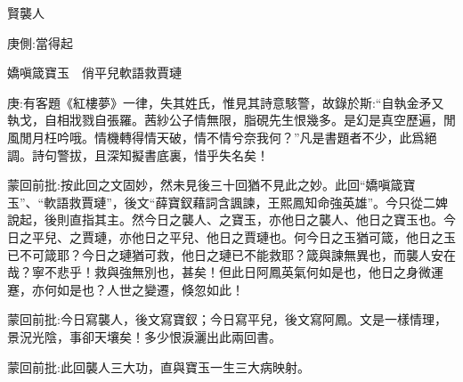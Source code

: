 

\begin{parag}
    賢襲人\begin{note}庚側:當得起\end{note}嬌嗔箴寶玉　俏平兒軟語救賈璉
\end{parag}

\begin{parag}
    \begin{note}庚:有客題《紅樓夢》一律，失其姓氏，惟見其詩意駭警，故錄於斯:“自執金矛又執戈，自相戕戮自張羅。茜紗公子情無限，脂硯先生恨幾多。是幻是真空歷遍，閒風閒月枉吟哦。情機轉得情天破，情不情兮奈我何？”凡是書題者不少，此爲絕調。詩句警拔，且深知擬書底裏，惜乎失名矣！\end{note}
\end{parag}


\begin{parag}
    \begin{note}蒙回前批:按此回之文固妙，然未見後三十回猶不見此之妙。此回“嬌嗔箴寶玉”、“軟語救賈璉”，後文“薛寶釵藉詞含諷諫，王熙鳳知命強英雄”。今只從二婢說起，後則直指其主。然今日之襲人、之寶玉，亦他日之襲人、他日之寶玉也。今日之平兒、之賈璉，亦他日之平兒、他日之賈璉也。何今日之玉猶可箴，他日之玉已不可箴耶？今日之璉猶可救，他日之璉已不能救耶？箴與諫無異也，而襲人安在哉？寧不悲乎！救與強無別也，甚矣！但此日阿鳳英氣何如是也，他日之身微運蹇，亦何如是也？人世之變遷，倏忽如此！\end{note}
\end{parag}


\begin{parag}
    \begin{note}蒙回前批:今日寫襲人，後文寫寶釵；今日寫平兒，後文寫阿鳳。文是一樣情理，景況光陰，事卻天壤矣！多少恨淚灑出此兩回書。\end{note}
\end{parag}


\begin{parag}
    \begin{note}蒙回前批:此回襲人三大功，直與寶玉一生三大病映射。\end{note}
\end{parag}


